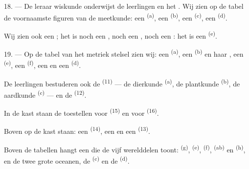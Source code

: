 \VUsaut{5.0mm}
\VUsaut{3.6mm}

18. --- De leraar wiskunde onderwijst de leerlingen
 en het . Wij zien op de
tabel de voornaamste figuren van de meetkunde: een  \textsuperscript{(a)}, een
 \textsuperscript{(b)}, een
 \textsuperscript{(c)}, een 
\textsuperscript{(d)}.

Wij zien ook een ; het is noch een , noch een
, noch een : het is een
 \textsuperscript{(e)}.

19. --- Op de tabel van het metriek stelsel zien wij: een 
\textsuperscript{(a)}, een  \textsuperscript{(b)} en haar
, een  \textsuperscript{(e)}, een
 \textsuperscript{(f)}, een  en een
 \textsuperscript{(d)}.

De leerlingen bestuderen ook de  \textsuperscript{(11)} --- de
dierkunde \textsuperscript{(a)}, de plantkunde \textsuperscript{(b)}, de aardkunde
\textsuperscript{(c)} --- en de
 \textsuperscript{(12)}.

In de kast staan de toestellen voor  \textsuperscript{(15)} en voor
 \textsuperscript{(16)}.

Boven op de kast staan: een  \textsuperscript{(14)}, een
 en een  \textsuperscript{(13)}.

Boven de tabellen hangt een  die de vijf werelddelen toont:
 \textsuperscript{(g)},  \textsuperscript{(e)},
 \textsuperscript{(f)}, 
\textsuperscript{(ab)} en  \textsuperscript{(h)}, en de twee grote oceanen, de
 \textsuperscript{(c)} en de
 \textsuperscript{(d)}.
\VUsaut{6.0mm}
\VUfilet{22mm}
